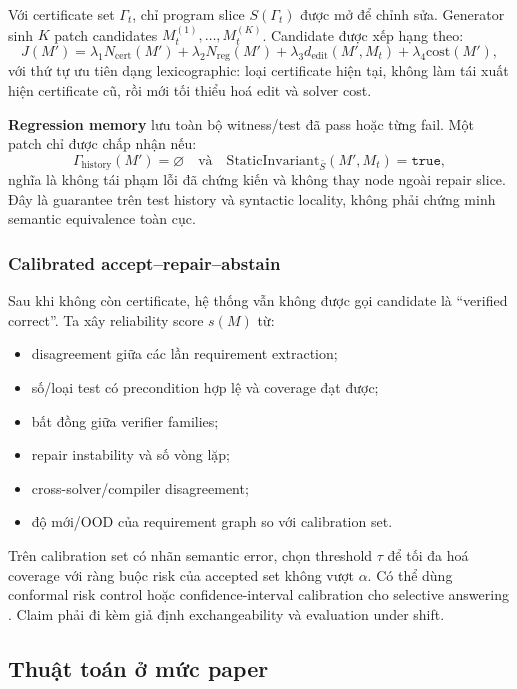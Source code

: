 \documentclass[11pt,a4paper]{article}
\begin{document}
Với certificate set \(\Gamma_t\), chỉ program slice \(S(\Gamma_t)\) được mở để chỉnh sửa. Generator sinh \(K\) patch candidates \(M_t^{(1)},\ldots,M_t^{(K)}\). Candidate được xếp hạng theo:
\[
J(M') =
\lambda_1 N_{\mathrm{cert}}(M')
+\lambda_2 N_{\mathrm{reg}}(M')
+\lambda_3 d_{\mathrm{edit}}(M',M_t)
+\lambda_4 \mathrm{cost}(M'),
\]
với thứ tự ưu tiên dạng lexicographic: loại certificate hiện tại, không làm tái xuất hiện certificate cũ, rồi mới tối thiểu hoá edit và solver cost.

\textbf{Regression memory} lưu toàn bộ witness/test đã pass hoặc từng fail. Một patch chỉ được chấp nhận nếu:
\[
\Gamma_{\mathrm{history}}(M')=\varnothing
\quad\text{và}\quad
\mathrm{StaticInvariant}_{\bar S}(M',M_t)=\texttt{true},
\]
nghĩa là không tái phạm lỗi đã chứng kiến và không thay node ngoài repair slice. Đây là guarantee trên test history và syntactic locality, không phải chứng minh semantic equivalence toàn cục.

\subsubsection{Calibrated accept--repair--abstain}

Sau khi không còn certificate, hệ thống vẫn không được gọi candidate là ``verified correct''. Ta xây reliability score \(s(M)\) từ:

\begin{itemize}
  \item disagreement giữa các lần requirement extraction;
  \item số/loại test có precondition hợp lệ và coverage đạt được;
  \item bất đồng giữa verifier families;
  \item repair instability và số vòng lặp;
  \item cross-solver/compiler disagreement;
  \item độ mới/OOD của requirement graph so với calibration set.
\end{itemize}

Trên calibration set có nhãn semantic error, chọn threshold \(\tau\) để tối đa hoá coverage với ràng buộc risk của accepted set không vượt \(\alpha\). Có thể dùng conformal risk control \parencite{angelopoulos2022crc} hoặc confidence-interval calibration cho selective answering \parencite{dong2026abstention}. Claim phải đi kèm giả định exchangeability và evaluation under shift.

\subsection{Thuật toán ở mức paper}
\end{document}
